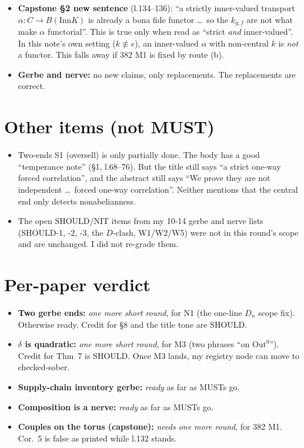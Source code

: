 \documentclass[10pt]{article}
\newcommand{\Out}{\mathrm{Out}}
\newcommand{\Inn}{\mathrm{Inn}}
\begin{document}
\begin{itemize}
  The exact condition is ``no nontrivial commutator is central''. Please say that instead of ``precisely when $Z(K)$ is trivial''.
\item \textbf{Capstone \S2 new sentence} (l.134--136): ``a strictly inner-valued transport $\alpha\colon C\to B(\Inn K)$ is already a bona fide functor \dots\ so the $k_{g,f}$ are not what make $\alpha$ functorial''. This is true only when read as ``strict \emph{and} inner-valued''. In this note's own setting ($k\not\equiv e$), an inner-valued $\alpha$ with non-central $k$ is \emph{not} a functor. This falls away if 382 M1 is fixed by route (b).
\item \textbf{Gerbe and nerve:} no new claims, only replacements. The replacements are correct.
\end{itemize}

\section{Other items (not MUST)}
\begin{itemize}
\item Two-ends S1 (oversell) is only partially done. The body has a good ``temperance note'' (\S1, l.68--76). But the title still says ``a strict one-way forced correlation'', and the abstract still says ``We prove they are not independent \dots\ forced one-way correlation''. Neither mentions that the central end only detects nonabelianness.
\item The open SHOULD/NIT items from my 10-14 gerbe and nerve lists (SHOULD-1, -2, -3, the $D$-clash, W1/W2/W5) were not in this round's scope and are unchanged. I did not re-grade them.
\end{itemize}

\section{Per-paper verdict}
\begin{itemize}
\item \textbf{Two gerbe ends:} \emph{one more short round}, for N1 (the one-line $D_n$ scope fix). Otherwise ready. Credit for \S8 and the title tone are SHOULD.
\item \textbf{$\delta$ is quadratic:} \emph{one more short round}, for M3 (two phrases ``on $\Out^0$''). Credit for Thm~7 is SHOULD. Once M3 lands, my registry node can move to checked-sober.
\item \textbf{Supply-chain inventory gerbe:} \emph{ready} as far as MUSTs go.
\item \textbf{Composition is a nerve:} \emph{ready} as far as MUSTs go.
\item \textbf{Couples on the torus (capstone):} \emph{needs one more round}, for 382 M1. Cor.~5 is false as printed while l.132 stands.
\end{itemize}
\end{document}
